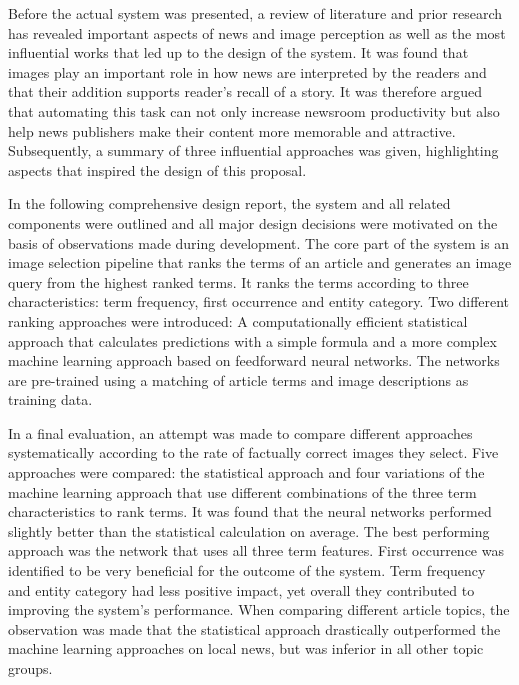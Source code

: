 \documentclass[11pt,a4paper,twoside]{article}
\begin{document}
Before the actual system was presented, a review of literature and prior research has revealed important aspects of news and image perception as well as the most influential works that led up to the design of the system. It was found that images play an important role in how news are interpreted by the readers and that their addition supports reader's recall of a story. It was therefore argued that automating this task can not only increase newsroom productivity but also help news publishers make their content more memorable and attractive. Subsequently, a summary of three influential approaches was given, highlighting aspects that inspired the design of this proposal.

In the following comprehensive design report, the system and all related components were outlined and all major design decisions were motivated on the basis of observations made during development. The core part of the system is an image selection pipeline that ranks the terms of an article and generates an image query from the highest ranked terms. It ranks the terms according to three characteristics: term frequency, first occurrence and entity category. Two different ranking approaches were introduced: A computationally efficient statistical approach that calculates predictions with a simple formula and a more complex machine learning approach based on feedforward neural networks. The networks are pre-trained using a matching of article terms and image descriptions as training data.

In a final evaluation, an attempt was made to compare different approaches systematically according to the rate of factually correct images they select. Five approaches were compared: the statistical approach and four variations of the machine learning approach that use different combinations of the three term characteristics to rank terms. It was found that the neural networks performed slightly better than the statistical calculation on average. The best performing approach was the network that uses all three term features. First occurrence was identified to be very beneficial for the outcome of the system. Term frequency and entity category had less positive impact, yet overall they contributed to improving the system's performance. When comparing different article topics, the observation was made that the statistical approach drastically outperformed the machine learning approaches on local news, but was inferior in all other topic groups.

\bigskip
\end{document}
